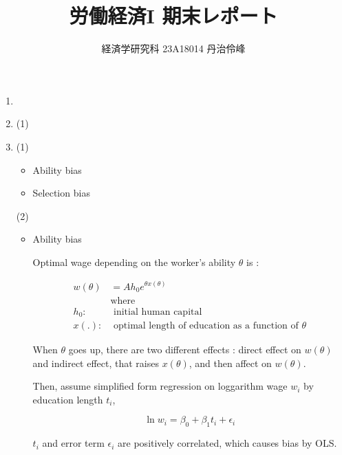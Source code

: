 \documentclass{jsarticle}
\begin{document}
\title{労働経済I 期末レポート}
\author{経済学研究科 23A18014 丹治伶峰}
\date{}
\maketitle

\large

 \begin{enumerate}
 
 \item
 
 
 
 \item
 
 (1)
 
 
 
 \item
 
 (1) 
  \begin{itemize}
  
  \item Ability bias
  
  \item Selection bias
  
  \end{itemize}
 
 (2) 
  \begin{itemize}
  
  \item Ability bias
  
  Optimal wage depending on the worker's ability $\theta$ is : 
  
   \begin{align*}
   w(\theta) & = A h_0 e^{\theta x(\theta)} \\
   & \text{where } \\
   h_0 : & \text{ initial human capital} \\
   x(.) : & \text{ optimal length of education as a function of } \theta
   \end{align*}
  
  When $\theta$ goes up, there are two different effects : direct effect on $w(\theta)$ and indirect effect, that raises $x(\theta)$, and then affect on $w(\theta)$.
  
  Then, assume simplified form regression on loggarithm wage $w_i$ by education length $t_i$,
  
  \[ \ln w_i = \beta_0 + \beta_1 t_i + \epsilon_i \]
  
  $t_i$ and error term $\epsilon_i$ are positively correlated, which causes bias by OLS.
  

\end{itemize}
\end{enumerate}
\end{document}
